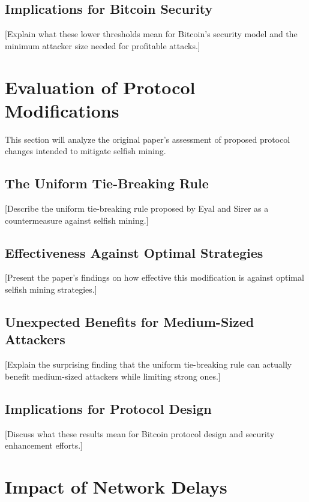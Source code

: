 \documentclass[conference]{IEEEtran}
\begin{document}
\subsection{Implications for Bitcoin Security}

[Explain what these lower thresholds mean for Bitcoin's security model and the minimum attacker size needed for profitable attacks.]

\section{Evaluation of Protocol Modifications}

This section will analyze the original paper's assessment of proposed protocol changes intended to mitigate selfish mining.

\subsection{The Uniform Tie-Breaking Rule}

[Describe the uniform tie-breaking rule proposed by Eyal and Sirer as a countermeasure against selfish mining.]

\subsection{Effectiveness Against Optimal Strategies}

[Present the paper's findings on how effective this modification is against optimal selfish mining strategies.]

\subsection{Unexpected Benefits for Medium-Sized Attackers}

[Explain the surprising finding that the uniform tie-breaking rule can actually benefit medium-sized attackers while limiting strong ones.]

\subsection{Implications for Protocol Design}

[Discuss what these results mean for Bitcoin protocol design and security enhancement efforts.]

\section{Impact of Network Delays}
\end{document}

